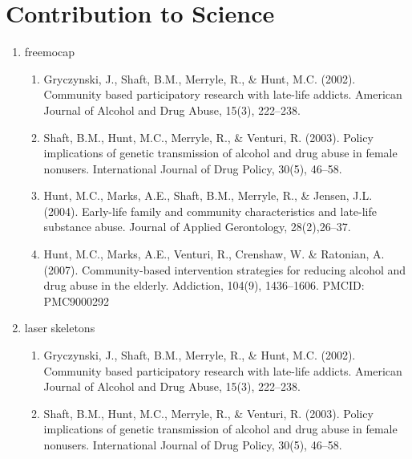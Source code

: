 \documentclass{nihbiosketch}
\begin{document}

\section{Contribution to Science}

\begin{enumerate}
\item freemocap

\begin{enumerate}

\item Gryczynski, J., Shaft, B.M., Merryle, R., \& Hunt, M.C. (2002). Community
        based participatory research with late-life addicts. American Journal
        of Alcohol and Drug Abuse, 15(3), 222--238.

\item Shaft, B.M., Hunt, M.C., Merryle, R., \& Venturi, R. (2003). Policy
        implications of genetic transmission of alcohol and drug abuse in
        female nonusers. International Journal of Drug Policy, 30(5), 46--58.

\item Hunt, M.C., Marks, A.E., Shaft, B.M., Merryle, R., \& Jensen, J.L.
        (2004). Early-life family and community characteristics and late-life
        substance abuse. Journal of Applied Gerontology, 28(2),26--37.

\item Hunt, M.C., Marks, A.E., Venturi, R., Crenshaw, W. \& Ratonian, A.
        (2007). Community-based intervention strategies for reducing alcohol
        and drug abuse in the elderly.  Addiction, 104(9), 1436--1606. PMCID:
        PMC9000292

\end{enumerate}

\item laser skeletons

\begin{enumerate}

\item Gryczynski, J., Shaft, B.M., Merryle, R., \& Hunt, M.C. (2002). Community
        based participatory research with late-life addicts. American Journal
        of Alcohol and Drug Abuse, 15(3), 222--238.

\item Shaft, B.M., Hunt, M.C., Merryle, R., \& Venturi, R. (2003). Policy
        implications of genetic transmission of alcohol and drug abuse in
        female nonusers. International Journal of Drug Policy, 30(5), 46--58.


\end{enumerate}
\end{enumerate}
\end{document}
